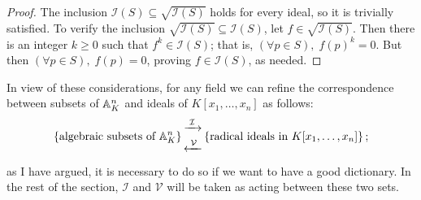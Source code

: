 \begin{proof}
  The inclusion $\mathcal{I}(S) \subseteq \sqrt{\mathcal{I}(S)}$ holds
  for every ideal, so it is trivially satisfied. To verify the
  inclusion $\sqrt{\mathcal{I}(S)} \subseteq \mathcal{I}(S)$, let
  $f \in \sqrt{\mathcal{I}(S)}$. Then there is an integer $k \geq 0$
  such that $f^k \in \mathcal{I}(S)$; that is,
  $(\forall p \in S),\; {f(p)}^k = 0$.  But then
  $(\forall p \in S),\; f(p) = 0$, proving $f \in \mathcal{I}(S)$, as
  needed.
\end{proof}
In view of these considerations, for any field we can refine the
correspondence between subsets of $\mathbb{A}^n_K$ and ideals of
$K[x_1, \dots, x_n]$ as follows:
\[
  \left\{\text{algebraic subsets of }\mathbb{A}^n_K\right\}
  \begin{matrix}
    \xrightarrow{\;\mathcal{I}\;} \\[3pt]
    \xleftarrow{\;\mathcal{V}\;}
  \end{matrix}
  \left\{\text{radical ideals in }K[x_1,\dots,x_n]\right\};
\]
as I have argued, it is necessary to do so if we want to have a good
dictionary. In the rest of the section, $\mathcal{I}$ and
$\mathcal{V}$ will be taken as acting between these two sets.


